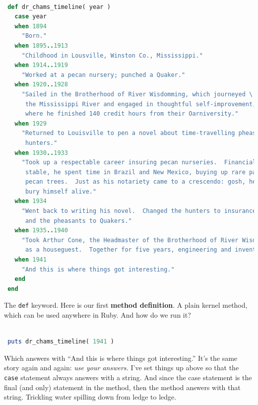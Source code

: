\documentclass[10pt,twoside]{report}
\begin{document}
\begin{lstlisting}[basicstyle=\ttfamily\color{basiccolor},
    commentstyle = \ttfamily\color{commentcolor},
    keywordstyle=\ttfamily\color{keywordscolor},
    stringstyle=\color{stringcolor},
    language=Ruby,
    basicstyle=\small\ttfamily,
    showstringspaces=false,
  ]

 def dr_chams_timeline( year )
   case year
   when 1894
     "Born."
   when 1895..1913
     "Childhood in Lousville, Winston Co., Mississippi."
   when 1914..1919
     "Worked at a pecan nursery; punched a Quaker."
   when 1920..1928
     "Sailed in the Brotherhood of River Wisdomming, which journeyed \
      the Mississippi River and engaged in thoughtful self-improvement, \
      where he finished 140 credit hours from their Oarniversity."
   when 1929
     "Returned to Louisville to pen a novel about time-travelling pheasant \
      hunters."
   when 1930..1933
     "Took up a respectable career insuring pecan nurseries.  Financially \
      stable, he spent time in Brazil and New Mexico, buying up rare paper-shell \
      pecan trees.  Just as his notariety came to a crescendo: gosh, he tried to \
      bury himself alive."
   when 1934
     "Went back to writing his novel.  Changed the hunters to insurance tycoons \
      and the pheasants to Quakers."
   when 1935..1940
     "Took Arthur Cone, the Headmaster of the Brotherhood of River Wisdomming, \
      as a houseguest.  Together for five years, engineering and inventing."
   when 1941
     "And this is where things got interesting."
   end
 end

\end{lstlisting}


The \lstinline[breaklines=true]|def| keyword.  Here is our first {\bf
  method definition}.  A plain kernel method, which can be used
anywhere in Ruby.  And how do we run it?


\begin{lstlisting}[basicstyle=\ttfamily\color{basiccolor},
    commentstyle = \ttfamily\color{commentcolor},
    keywordstyle=\ttfamily\color{keywordscolor},
    stringstyle=\color{stringcolor},
    language=Ruby,
    basicstyle=\small\ttfamily,
    showstringspaces=false,
  ]

 puts dr_chams_timeline( 1941 )

\end{lstlisting}


Which answers with ``And this is where things got interesting.''  It's
the same story again and again: {\em use your answers.}  I've set
things up above so that the \lstinline[breaklines=true]|case|
statement always answers with a string. And since the case statement
is the final (and only) statement in the method, then the method
answers with that string.  Trickling water spilling down from ledge to
ledge.
\end{document}
